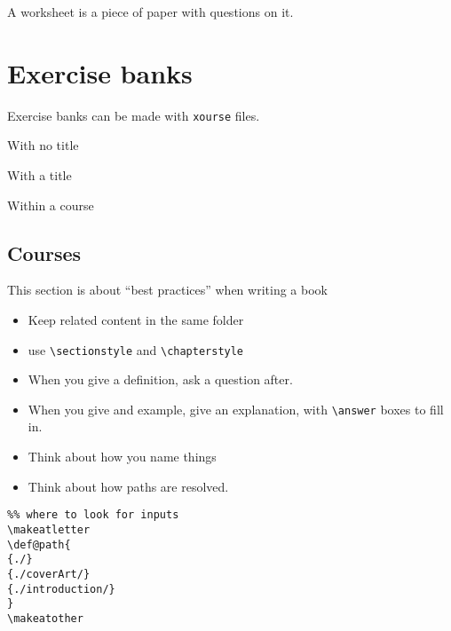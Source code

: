 \documentclass{ximera}
\begin{document}
A worksheet is a piece of paper with questions on it.

\section{Exercise banks}

Exercise banks can be made with \verb!xourse! files.

With no title

With a title

Within a course

\onecolumn
\begin{multicols}{2}
  \section{Courses}

  This section is about ``best practices'' when writing a book
  \begin{itemize}
    \item Keep related content in the same folder
    \item use \texttt{\textbackslash sectionstyle} and
          \texttt{\textbackslash chapterstyle}
    \item When you give a definition, ask a question after.
    \item When you give and example, give an explanation, with
          \texttt{\textbackslash answer} boxes to fill in.
    \item Think about how you name things
    \item Think about how paths are resolved.
  \end{itemize}

  \begin{example}
    \begin{verbatim} 
%% where to look for inputs
\makeatletter
\def@path{
{./}
{./coverArt/}
{./introduction/}
}
\makeatother   
\end{verbatim}
  \end{example}

\end{multicols}
\end{document}

